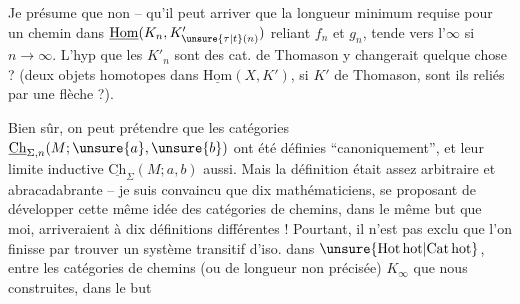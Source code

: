Je présume que non -- qu'il peut arriver que
la longueur minimum requise  pour un 
chemin dans $\underline{\mathrm{Hom}}(K_n,K'_{\unsure{\tau|t}(n)})$ reliant $f_n$ et $g_n$,
tende vers l'$\infty$ si $n\to\infty$. L'hyp que les
$K'_n$ sont des cat. de Thomason y changerait
quelque chose ? (deux objets homotopes dans
$\underline{\mathrm{Hom}}(X,K')$, si $K'$ de Thomason, sont ils reliés
par une flèche ?).

Bien sûr, on peut prétendre que les catégories
$\underline{\mathrm{Ch}}_{\Sigma,n}(M;\unsure{a},\unsure{b})$ ont été définies ``canoniquement'', et
leur limite inductive $\underline{\mathrm{Ch}}_\Sigma(M;a,b)$ aussi.
Mais la définition était assez arbitraire et abracadabrante -- je suis convaincu que dix mathématiciens,
se proposant de développer cette même
idée des catégories de chemins, dans le même
but que moi, arriveraient à dix définitions
différentes ! Pourtant, il n'est pas exclu que
l'on finisse par trouver un système transitif
d'iso. dans $\unsure{\mathrm{Hot}\,\mathrm{hot}|\mathrm{Cat}\,\mathrm{hot}}$, entre les catégories
de chemins   (ou de longueur non précisée)
$K_\infty$  que nous  construites, dans le but
